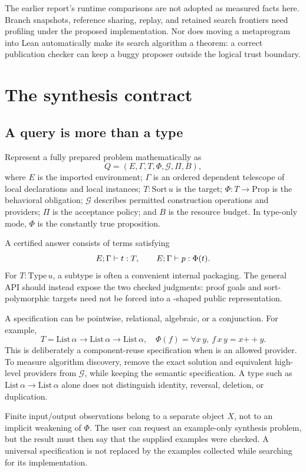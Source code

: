 The earlier report's runtime comparisons are not adopted as measured facts here. Branch snapshots, reference sharing, replay, and retained search frontiers need profiling under the proposed implementation. Nor does moving a metaprogram into Lean automatically make its search algorithm a theorem: a correct publication checker can keep a buggy proposer outside the logical trust boundary.

\section{The synthesis contract}
\label{sec:contract}
\subsection{A query is more than a type}
Represent a fully prepared problem mathematically as
\[
 Q=(E,\Gamma,T,\Phi,\mathcal G,\Pi,B),
\]
where $E$ is the imported environment; $\Gamma$ is an ordered dependent telescope of local declarations and local instances; $T:\mathrm{Sort}\,u$ is the target; $\Phi:T\to\mathrm{Prop}$ is the behavioral obligation; $\mathcal G$ describes permitted construction operations and providers; $\Pi$ is the acceptance policy; and $B$ is the resource budget. In type-only mode, $\Phi$ is the constantly true proposition.

A certified answer consists of terms satisfying
\begin{equation}\label{eq:answer}
 E;\Gamma\vdash t:T,
 \qquad
 E;\Gamma\vdash p:\Phi(t).
\end{equation}
For $T:\mathrm{Type}\,u$, a subtype is often a convenient internal packaging. The general API should instead expose the two checked judgments: proof goals and sort-polymorphic targets need not be forced into a -shaped public representation.

A specification can be pointwise, relational, algebraic, or a conjunction. For example,
\[
 T=\mathrm{List}\,\alpha\to\mathrm{List}\,\alpha\to\mathrm{List}\,\alpha,
 \quad
 \Phi(f)=\forall x\,y,\ f\,x\,y=x\mathbin{++}y.
\]
This is deliberately a component-reuse specification when  is an allowed provider. To measure algorithm discovery, remove the exact solution and equivalent high-level providers from $\mathcal G$, while keeping the semantic specification. A type such as $\mathrm{List}\,\alpha\to\mathrm{List}\,\alpha$ alone does not distinguish identity, reversal, deletion, or duplication.

Finite input/output observations belong to a separate object $X$, not to an implicit weakening of $\Phi$. The user can request an example-only synthesis problem, but the result must then say that the supplied examples were checked. A universal specification is not replaced by the examples collected while searching for its implementation.

